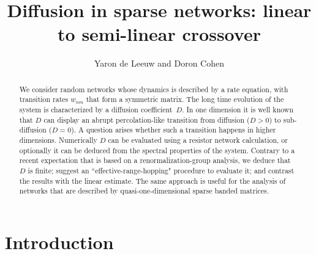 \documentclass[aps,prb,floats,floatfix,twocolumn]{revtex4}
\begin{document}
\title{Diffusion in sparse networks: linear to semi-linear crossover}

\author{Yaron de Leeuw and Doron Cohen}


\begin{abstract}
We consider random networks whose dynamics is
described by a rate equation, with transition rates $w_{nm}$
that form a symmetric matrix. The long time evolution
of the system is characterized by a diffusion coefficient~$D$.
In one dimension it is well known that $D$ can display an abrupt
percolation-like transition from diffusion (${D>0}$)
to sub-diffusion (${D=0}$). A question arises whether
such a transition happens in higher dimensions.
Numerically $D$ can be evaluated using a resistor network
calculation, or optionally it can be deduced from 
the spectral properties of the system. Contrary to a recent 
expectation that is based on a renormalization-group analysis, 
we deduce that $D$ is finite; 
suggest an ``effective-range-hopping" procedure to evaluate it;
and contrast the results with the linear estimate.
The same approach is useful for the analysis of 
networks that are described by quasi-one-dimensional  
sparse banded matrices. 
\end{abstract}


\maketitle


\section{Introduction}
\end{document}

